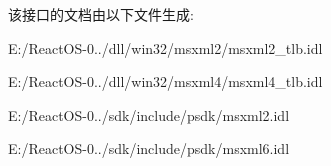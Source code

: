 该接口的文档由以下文件生成\+:\begin{DoxyCompactItemize}
\item 
E\+:/\+React\+O\+S-\/0../dll/win32/msxml2/msxml2\+\_\+tlb.\+idl\item 
E\+:/\+React\+O\+S-\/0../dll/win32/msxml4/msxml4\+\_\+tlb.\+idl\item 
E\+:/\+React\+O\+S-\/0../sdk/include/psdk/msxml2.\+idl\item 
E\+:/\+React\+O\+S-\/0../sdk/include/psdk/msxml6.\+idl\end{DoxyCompactItemize}

